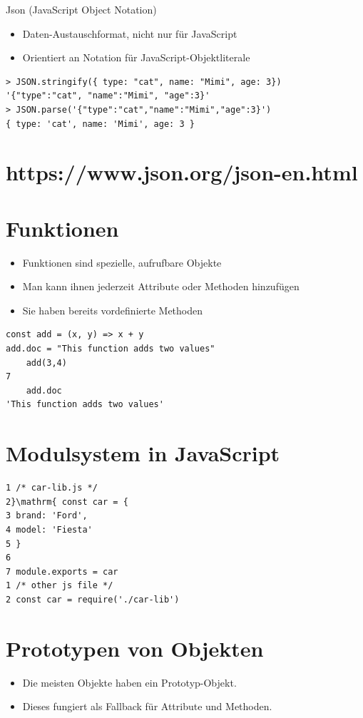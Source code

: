 \documentclass[10pt]{article}
\begin{document}
Json (JavaScript Object Notation)

\begin{itemize}
  \item Daten-Austauschformat, nicht nur für JavaScript
  \item Orientiert an Notation für JavaScript-Objektliterale
\end{itemize}

\begin{verbatim}
> JSON.stringify({ type: "cat", name: "Mimi", age: 3})
'{"type":"cat", "name":"Mimi", "age":3}'
> JSON.parse('{"type":"cat","name":"Mimi","age":3}')
{ type: 'cat', name: 'Mimi', age: 3 }
\end{verbatim}

\section*{https://www.json.org/json-en.html}
\section*{Funktionen}
\begin{itemize}
  \item Funktionen sind spezielle, aufrufbare Objekte
  \item Man kann ihnen jederzeit Attribute oder Methoden hinzufügen
  \item Sie haben bereits vordefinierte Methoden
\end{itemize}

\begin{verbatim}
const add = (x, y) => x + y
add.doc = "This function adds two values"
    add(3,4)
7
    add.doc
'This function adds two values'
\end{verbatim}

\section*{Modulsystem in JavaScript}
\begin{verbatim}
1 /* car-lib.js */
2}\mathrm{ const car = {
3 brand: 'Ford',
4 model: 'Fiesta'
5 }
6
7 module.exports = car
1 /* other js file */
2 const car = require('./car-lib')
\end{verbatim}

\section*{Prototypen von Objekten}
\begin{itemize}
  \item Die meisten Objekte haben ein Prototyp-Objekt.
  \item Dieses fungiert als Fallback für Attribute und Methoden.
\end{itemize}
\end{document}
